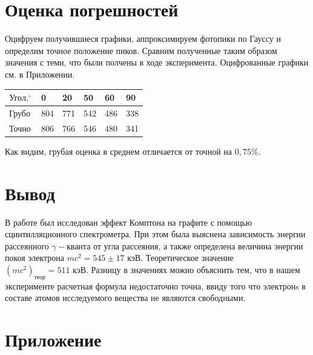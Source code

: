 \documentclass[a4paper,12pt]{article} %
\begin{document}
\section{Оценка погрешностей}

\noindent Оцифруем получившиеся графики, аппроксимируем фотопики по Гауссу и определим точное положение пиков. Сравним полученные таким образом значения с теми, что были полчены в ходе эксперимента. Оцифрованные графики см. в Приложении.

\begin{table}[h!]
\begin{tabular}{|l|l|l|l|l|l|}
\hline
$\text{Угол},   ^\circ$ & 0   & 20  & 50  & 60  & 90  \\ \hline
Грубо                   & 804 & 771 & 542 & 486 & 338 \\ \hline
Точно                   & 806 & 766 & 546 & 480 & 341 \\ \hline
\end{tabular}
\end{table}

\noindent Как видим, грубая оценка в среднем отличается от точной на $0,75\%$.

\section{Вывод}

\noindent В работе был исследован эффект Комптона на графите с помощью сцинтилляционного спектрометра. При этом была выяснена зависимость энергии рассеянного $\gamma-$кванта от угла рассеяния, а также определена величина энергии покоя электрона $mc^2 = 545 \pm 17 \text{ кэВ}.$ Теоретическое значение $(mc^2)_\text{теор} = 511 \text{ кэВ}.$ Разницу в значениях можно объяснить тем, что в нашем эксперименте расчетная формула недостаточно точна, ввиду того что электронs в составе атомов исследуемого вещества не являются свободными.

\section{Приложение}
\end{document}
